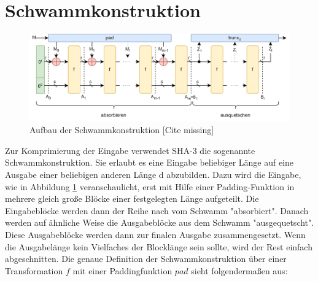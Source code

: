 \section{Schwammkonstruktion}
\label{cha:schwammkonstruktion}
\begin{figure}
    \center
    \includegraphics[scale=0.175]{images/Schwammkonstruktion.png}
    \caption{Aufbau der Schwammkonstruktion [Cite missing]}
    \label{fig:schwammkonstruktion}
\end{figure}
Zur Komprimierung der Eingabe verwendet SHA-3 die sogenannte Schwammkonstruktion.
Sie erlaubt es eine Eingabe beliebiger Länge auf eine Ausgabe einer beliebigen anderen Länge d abzubilden.
Dazu wird die Eingabe, wie in Abbildung \ref{fig:schwammkonstruktion} veranschaulicht, erst mit Hilfe einer
Padding-Funktion in mehrere gleich große Blöcke einer festgelegten Länge aufgeteilt. Die Eingabeblöcke werden
dann der Reihe nach vom Schwamm "absorbiert". Danach werden auf ähnliche Weise die Ausgabeblöcke aus dem Schwamm "ausgequetscht".
Diese Ausgabeblöcke werden dann zur finalen Ausgabe zusammengesetzt. Wenn die Ausgabelänge kein Vielfaches der Blocklänge sein sollte, wird der Rest einfach abgeschnitten.
Die genaue Definition der Schwammkonstruktion über einer Transformation $f$ mit einer Paddingfunktion $pad$ sieht folgendermaßen aus:

